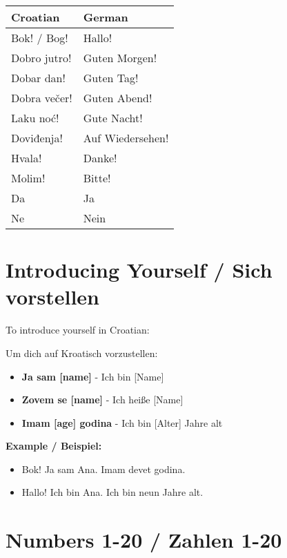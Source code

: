 \begin{vocabulary}
\begin{tabular}{ll}
\toprule
Croatian & German \\
\midrule
Bok! / Bog! & Hallo! \\
Dobro jutro! & Guten Morgen! \\
Dobar dan! & Guten Tag! \\
Dobra večer! & Guten Abend! \\
Laku noć! & Gute Nacht! \\
Doviđenja! & Auf Wiedersehen! \\
Hvala! & Danke! \\
Molim! & Bitte! \\
Da & Ja \\
Ne & Nein \\
\bottomrule
\end{tabular}
\end{vocabulary}

\section{Introducing Yourself / Sich vorstellen}

\begin{grammar}
To introduce yourself in Croatian:

Um dich auf Kroatisch vorzustellen:

\begin{itemize}
    \item \textbf{Ja sam [name]} - Ich bin [Name]
    \item \textbf{Zovem se [name]} - Ich heiße [Name]
    \item \textbf{Imam [age] godina} - Ich bin [Alter] Jahre alt
\end{itemize}
\end{grammar}

\textbf{Example / Beispiel:}
\begin{itemize}
    \item Bok! Ja sam Ana. Imam devet godina.
    \item Hallo! Ich bin Ana. Ich bin neun Jahre alt.
\end{itemize}

\section{Numbers 1-20 / Zahlen 1-20}

